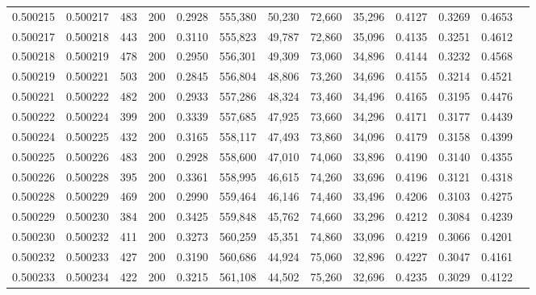 \begin{tabular}{rrrrrrrrrrrrr}
0.500215 & 0.500217 &    483 & 200 &                                     0.2928 & 555,380 &  50,230 &  72,660 &  35,296 & 0.4127 & 0.3269 & 0.4653 \\
0.500217 & 0.500218 &    443 & 200 &                                     0.3110 & 555,823 &  49,787 &  72,860 &  35,096 & 0.4135 & 0.3251 & 0.4612 \\
0.500218 & 0.500219 &    478 & 200 &                                     0.2950 & 556,301 &  49,309 &  73,060 &  34,896 & 0.4144 & 0.3232 & 0.4568 \\
0.500219 & 0.500221 &    503 & 200 &                                     0.2845 & 556,804 &  48,806 &  73,260 &  34,696 & 0.4155 & 0.3214 & 0.4521 \\
0.500221 & 0.500222 &    482 & 200 &                                     0.2933 & 557,286 &  48,324 &  73,460 &  34,496 & 0.4165 & 0.3195 & 0.4476 \\
0.500222 & 0.500224 &    399 & 200 &                                     0.3339 & 557,685 &  47,925 &  73,660 &  34,296 & 0.4171 & 0.3177 & 0.4439 \\
0.500224 & 0.500225 &    432 & 200 &                                     0.3165 & 558,117 &  47,493 &  73,860 &  34,096 & 0.4179 & 0.3158 & 0.4399 \\
0.500225 & 0.500226 &    483 & 200 &                                     0.2928 & 558,600 &  47,010 &  74,060 &  33,896 & 0.4190 & 0.3140 & 0.4355 \\
0.500226 & 0.500228 &    395 & 200 &                                     0.3361 & 558,995 &  46,615 &  74,260 &  33,696 & 0.4196 & 0.3121 & 0.4318 \\
0.500228 & 0.500229 &    469 & 200 &                                     0.2990 & 559,464 &  46,146 &  74,460 &  33,496 & 0.4206 & 0.3103 & 0.4275 \\
0.500229 & 0.500230 &    384 & 200 &                                     0.3425 & 559,848 &  45,762 &  74,660 &  33,296 & 0.4212 & 0.3084 & 0.4239 \\
0.500230 & 0.500232 &    411 & 200 &                                     0.3273 & 560,259 &  45,351 &  74,860 &  33,096 & 0.4219 & 0.3066 & 0.4201 \\
0.500232 & 0.500233 &    427 & 200 &                                     0.3190 & 560,686 &  44,924 &  75,060 &  32,896 & 0.4227 & 0.3047 & 0.4161 \\
0.500233 & 0.500234 &    422 & 200 &                                     0.3215 & 561,108 &  44,502 &  75,260 &  32,696 & 0.4235 & 0.3029 & 0.4122 \\

\end{tabular}
